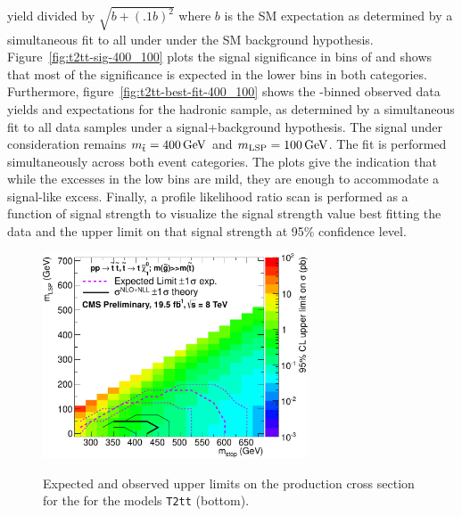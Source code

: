 yield divided by $\sqrt{b+(.1b)^2}$ where $b$ is the SM expectation 
as determined by a simultaneous fit to all under under the SM background 
hypothesis. Figure~\ref{fig:t2tt-sig-400_100} plots the signal significance in bins of 
\scalht and shows that most of the significance is expected in the 
lower \scalht bins in both categories. Furthermore, 
figure~\ref{fig:t2tt-best-fit-400_100} shows the \scalht-binned 
observed data yields and expectations for the hadronic sample, as determined 
by a simultaneous fit to all data samples under a signal+background 
hypothesis. The signal under consideration remains $m_{\tilde{\rm t}} = 400\,\text{Ge\hspace{-.08em}V}$ and 
$m_{\text{LSP}} = 100\,\text{Ge\hspace{-.08em}V}$. The fit is performed simultaneously across 
both event categories. The plots give the indication that while the excesses 
in the low \scalht bins are mild, they are enough to accommodate a signal-like
excess. Finally, a profile likelihood ratio scan is performed 
as a function of signal strength to visualize the signal strength value 
best fitting the data and the upper limit on that signal strength
at 95\% confidence level. 

\begin{figure}[h!]
  \begin{center}
      \includegraphics[width=0.70\textwidth,clip=true,]{figures/limits/merged/T2tt/v6/CLs_frequentist_T2tt_2012pf_1b_ge4j_2b_ge4j_xsLimit}
    \label{fig:upperLimits-t2tt}
    \caption{Expected and observed upper limits on the production cross section 
    for the for the models \texttt{T2tt} (bottom). }
  \end{center}
\end{figure}

